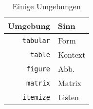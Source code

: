 \begin{table}
\begin{tabular}{r|l}
	Umgebung & Sinn \\
	\hline
	{\tt tabular} & Form \\
	{\tt table} & Kontext \\
	{\tt figure} & Abb. \\
	{\tt matrix} & Matrix \\
	{\tt itemize} & Listen \\
\end{tabular}
	\label<4>{tab:environments}
	\caption{Einige Umgebungen}
\end{table}
